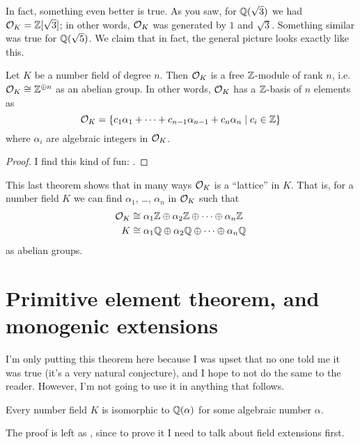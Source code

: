 In fact, something even better is true.
As you saw, for $\mathbb Q(\sqrt 3)$ we had $\mathcal O_K = \mathbb Z[\sqrt 3]$;
in other words, $\mathcal O_K$ was generated by $1$ and $\sqrt 3$.
Something similar was true for $\mathbb Q(\sqrt 5)$.
We claim that in fact, the general picture looks exactly like this.

\begin{theorem}
	Let $K$ be a number field of degree $n$.
	Then $\mathcal O_K$ is a free $\mathbb Z$-module of rank $n$,
	i.e.\ $\mathcal O_K \cong \mathbb Z^{\oplus n}$ as an abelian group.
	In other words, $\mathcal O_K$ has a $\mathbb Z$-basis of $n$ elements as
	\[ \mathcal O_K
		= \left\{ c_1\alpha_1 + \dots
			+ c_{n-1}\alpha_{n-1} + c_n\alpha_n
			\mid c_i \in \mathbb Z \right\} \]
	where $\alpha_i$ are algebraic integers in $\mathcal O_K$.
	\label{thm:OK_free_Z_module}
\end{theorem}
\begin{proof}
	I find this kind of fun: .
\end{proof}

This last theorem shows that in many ways $\mathcal O_K$ is a ``lattice'' in $K$.
That is, for a number field $K$ we can find $\alpha_1$, \dots, $\alpha_n$
in $\mathcal O_K$ such that
\begin{align*}
	\mathcal O_K &\cong \alpha_1\mathbb Z \oplus \alpha_2\mathbb Z \oplus \dots \oplus \alpha_n\mathbb Z \\
	K &\cong \alpha_1\mathbb Q \oplus \alpha_2\mathbb Q \oplus \dots \oplus \alpha_n\mathbb Q
\end{align*}
as abelian groups.

\section{Primitive element theorem, and monogenic extensions}
I'm only putting this theorem here because I was upset that no one
told me it was true (it's a very natural conjecture),
and I hope to not do the same to the reader.
However, I'm not going to use it in anything that follows.

\begin{theorem}
	Every number field $K$ is isomorphic to $\mathbb Q(\alpha)$
	for some algebraic number $\alpha$.
	\label{thm:artin_primitive_elm}
\end{theorem}
The proof is left as , since to prove it I need to talk
about field extensions first.


